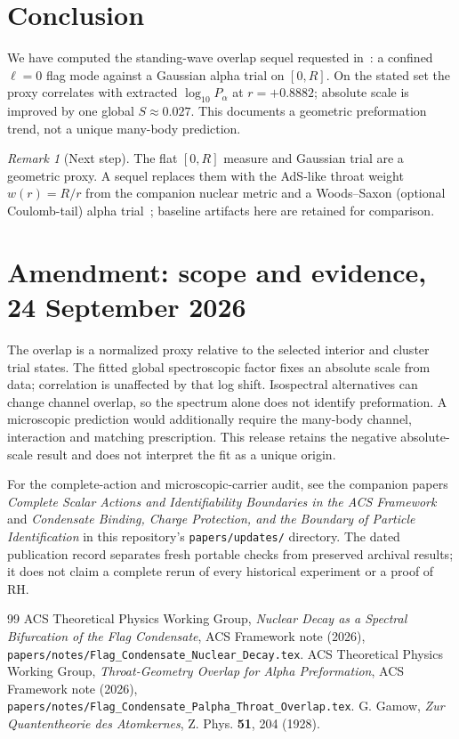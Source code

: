 \documentclass[11pt,a4paper]{article}
\theoremstyle{remark}
\newtheorem*{remark}{Remark}
\begin{document}
\section{Conclusion}
We have computed the standing-wave overlap sequel requested
in~\cite{NuclearDecay2026}: a confined $\ell=0$ flag mode against a
Gaussian alpha trial on $[0,R]$.  On the stated set the proxy correlates
with extracted $\log_{10} P_\alpha$ at $r=+0.8882$; absolute scale is
improved by one global $S\approx 0.027$.  This documents a geometric
preformation trend, not a unique many-body prediction.

\begin{remark}[Next step]
The flat $[0,R]$ measure and Gaussian trial are a geometric proxy.
A sequel replaces them with the AdS-like throat weight $w(r)=R/r$ from
the companion nuclear metric and a Woods--Saxon (optional Coulomb-tail)
alpha trial~\cite{PalphaThroatOverlap2026}; baseline artifacts here are
retained for comparison.
\end{remark}


\section*{Amendment: scope and evidence, 24 September 2026}
The overlap is a normalized proxy relative to the selected interior and cluster trial states. The fitted global spectroscopic factor fixes an absolute scale from data; correlation is unaffected by that log shift. Isospectral alternatives can change channel overlap, so the spectrum alone does not identify preformation. A microscopic prediction would additionally require the many-body channel, interaction and matching prescription. This release retains the negative absolute-scale result and does not interpret the fit as a unique origin.

For the complete-action and microscopic-carrier audit, see the companion
papers \emph{Complete Scalar Actions and Identifiability Boundaries in the ACS
Framework} and \emph{Condensate Binding, Charge Protection, and the Boundary
of Particle Identification} in this repository's \texttt{papers/updates/}
directory. The dated publication record separates fresh portable checks
from preserved archival results; it does not claim a complete rerun of every
historical experiment or a proof of RH.

\begin{thebibliography}{99}
  ACS Theoretical Physics Working Group,
  \emph{Nuclear Decay as a Spectral Bifurcation of the Flag Condensate},
  ACS Framework note (2026),
  \nolinkurl{papers/notes/Flag_Condensate_Nuclear_Decay.tex}.
  ACS Theoretical Physics Working Group,
  \emph{Throat-Geometry Overlap for Alpha Preformation},
  ACS Framework note (2026),
  \nolinkurl{papers/notes/Flag_Condensate_Palpha_Throat_Overlap.tex}.
  G. Gamow, \emph{Zur Quantentheorie des Atomkernes},
  Z. Phys. \textbf{51}, 204 (1928).
\end{thebibliography}
\end{document}

